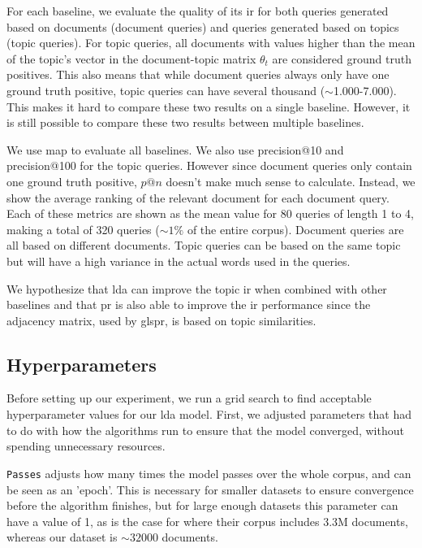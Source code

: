 For each baseline, we evaluate the quality of its \gls{ir} for both queries generated based on documents (document queries) and queries generated based on topics (topic queries).
For topic queries, all documents with values higher than the mean of the topic's vector in the document-topic matrix $\theta_t$ are considered ground truth positives.
This also means that while document queries always only have one ground truth positive, topic queries can have several thousand ($\sim$1.000-7.000).
This makes it hard to compare these two results on a single baseline.
However, it is still possible to compare these two results between multiple baselines.

We use \gls{map} to evaluate all baselines. 
We also use precision@10 and precision@100 for the topic queries. 
However since document queries only contain one ground truth positive, $p @ n$ doesn't make much sense to calculate. 
Instead, we show the average ranking of the relevant document for each document query.
Each of these metrics are shown as the mean value for 80 queries of length 1 to 4, making a total of 320 queries ($\sim$$1\%$ of the entire corpus).
Document queries are all based on different documents. 
Topic queries can be based on the same topic but will have a high variance in the actual words used in the queries.

We hypothesize that \gls{lda} can improve the topic \gls{ir} when combined with other baselines and that \gls{pr} is also able to improve the \gls{ir} performance since the adjacency matrix, used by gls{pr}, is based on topic similarities.


\subsection{Hyperparameters}\label{subsec:hyperparameters}
Before setting up our experiment, we run a grid search to find acceptable hyperparameter values for our \gls{lda} model.
First, we adjusted parameters that had to do with how the algorithms run to ensure that the model converged, without spending unnecessary resources.

\texttt{Passes} adjusts how many times the model passes over the whole corpus, and can be seen as an 'epoch'. 
This is necessary for smaller datasets to ensure convergence before the algorithm finishes, but for large enough datasets this parameter can have a value of 1, as is the case for \citeauthor{blei2010online}\cite{blei2010online} where their corpus includes 3.3M documents, whereas our dataset is $\sim32000$ documents.

